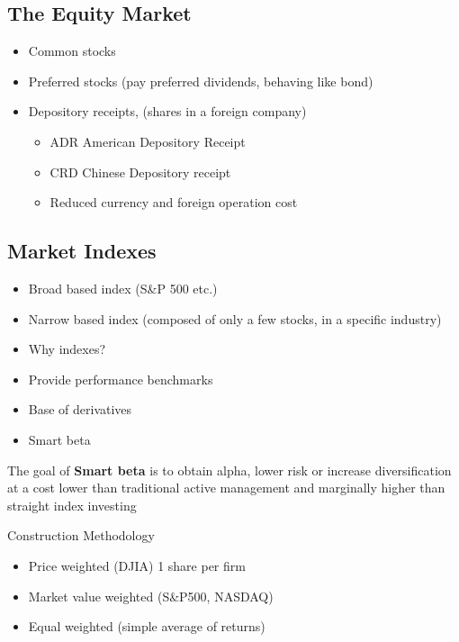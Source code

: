 \documentclass[
]{book}
\providecommand{\tightlist}{%
  \setlength{\itemsep}{0pt}\setlength{\parskip}{0pt}}
\begin{document}
\hypertarget{the-equity-market}{%
\subsection{The Equity Market}\label{the-equity-market}}

\begin{itemize}
\tightlist
\item
  Common stocks
\item
  Preferred stocks (pay preferred dividends, behaving like bond)
\item
  Depository receipts, (shares in a foreign company)

  \begin{itemize}
  \tightlist
  \item
    ADR American Depository Receipt
  \item
    CRD Chinese Depository receipt
  \item
    Reduced currency and foreign operation cost
  \end{itemize}
\end{itemize}

\hypertarget{market-indexes}{%
\subsection{Market Indexes}\label{market-indexes}}

\begin{itemize}
\tightlist
\item
  Broad based index (S\&P 500 etc.)
\item
  Narrow based index (composed of only a few stocks, in a specific industry)
\item
  Why indexes?
\item
  Provide performance benchmarks
\item
  Base of derivatives
\item
  Smart beta
\end{itemize}

The goal of \textbf{Smart beta} is to obtain alpha, lower risk or increase diversification at a cost lower than traditional active management and marginally higher than straight index investing

Construction Methodology

\begin{itemize}
\tightlist
\item
  Price weighted (DJIA) 1 share per firm
\item
  Market value weighted (S\&P500, NASDAQ)
\item
  Equal weighted (simple average of returns)
\end{itemize}
\end{document}
